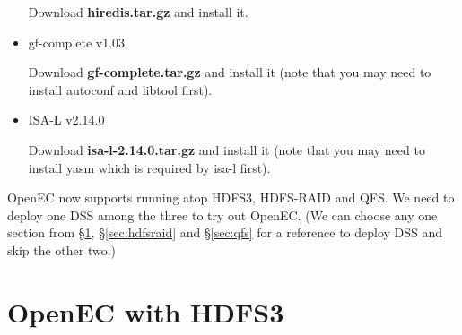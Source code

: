 \documentclass[letterpaper,12pt]{article}
\newcommand{\openec}{{\sf\small OpenEC}\xspace}
\begin{document}
\begin{itemize}
Download {\bf hiredis.tar.gz} and install it.

\begin{center}
\noindent{}
\end{center}

\item gf-complete v1.03

Download {\bf gf-complete.tar.gz} and install it (note that you may need to
install {\sf autoconf} and {\sf libtool} first).

\begin{center}
\noindent{}
\end{center}

\item ISA-L v2.14.0

Download {\bf isa-l-2.14.0.tar.gz} and install it (note that you may need to install
{\sf yasm} which is required by isa-l first).

\begin{center}
\noindent{}
\end{center}
	
\end{itemize}

\openec now supports running atop HDFS3, HDFS-RAID and QFS. We need to deploy
one DSS among the three to try out \openec. (We can choose any one section
from \S\ref{sec:hdfs3}, \S\ref{sec:hdfsraid} and \S\ref{sec:qfs} for a reference
to deploy DSS and skip the other two.)

\section{OpenEC with HDFS3}
\label{sec:hdfs3}
\end{document}
